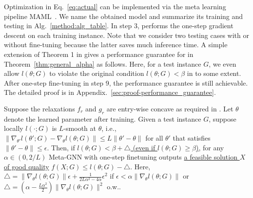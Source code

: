 Optimization in Eq.~\ref{eq:actual} can be implemented via the meta learning pipeline MAML~\citep{finn2017model}. We name the obtained model \proj and summarize its training and testing in Alg.~\ref{method:alg_table}. In step 3, \proj performs the one-step gradient descent on each training instance. Note that we consider two testing cases with or without fine-tuning because the latter saves much inference time. A simple extension of Theorem 1 in \citep{wang2022unsupervised} gives a performance guarantee for \proj in Theorem~\ref{thm:general_alpha} as follows. Here, for a test instance $G$, we even allow $l(\theta;G)$ to violate the original condition $l(\theta;G)<\beta$ in \citep{wang2022unsupervised} to some extent.  After one-step fine-tuning in step 9, the performance guarantee is still achievable. The detailed proof is in Appendix.~\ref{sec:proof-performance_guarantee}.%


\begin{theorem}
\label{thm:general_alpha}
Suppose the relaxations $f_r$ and $g_r$ are entry-wise concave as required in \citep{wang2022unsupervised}. Let $\theta$ denote the learned parameter after training.  Given a test instance $G$, suppose locally $l(\cdot;G)$ is $L$-smooth at $\theta$, i.e., $\|\nabla_{\theta'} l(\theta';G) - \nabla_{\theta} l(\theta;G)\|\leq L\|\theta' - \theta\|$ for all $\theta'$ that satisfies $\|\theta' - \theta\|\leq \epsilon$. Then, if \underline{$l(\theta;G) < \beta + \triangle$ (even if $l(\theta;G) \geq \beta$)}, for any $\alpha \in (0, 2/L)$ Meta-GNN with one-step finetuning outputs \underline{a feasible solution $X$ of good quality} $f(X;G)\leq l(\theta;G)-\triangle$. Here, $\triangle = \|\nabla_{\theta} l(\theta;G)\| \epsilon + \frac{1}{2L\alpha^2 - 4\alpha}\epsilon^2$ if $\epsilon < \alpha \|\nabla_{\theta} l(\theta;G)\|$ or $\triangle = (\alpha - \frac{L\alpha^2}{2})\|\nabla_{\theta}l(\theta;G)\|^2$ o.w..
\end{theorem}




